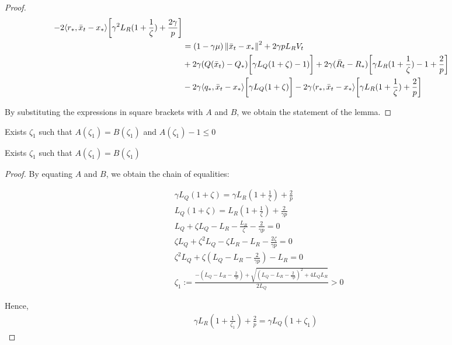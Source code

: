 \begin{proof}
\begin{align}
\begin{split}
            - 2\langle r_*, \bar{x}_t - x_*\rangle\biggr[ \gamma^2 L_R(1+\frac{1}{\zeta}) + \frac{2\gamma}{p} \biggr] \\
            &= (1 - \gamma \mu)\left\|\bar{x}_t - x_*\right\|^2 + 2 \gamma p L_R V_t \\
            &+ 2\gamma (Q(\bar{x}_t) - Q_*)\biggr[ \gamma L_Q (1+\zeta) - 1) \biggr] 
            + 2\gamma (\bar{R}_t - R_*)\biggr[ \gamma L_R (1+\frac{1}{\zeta}) - 1 + \frac{2}{p} \biggr] \\
            &- 2\gamma \langle q_*, \bar{x}_t - x_*\rangle\biggr[ \gamma L_Q(1+\zeta)  \biggr]
            - 2\gamma \langle r_*, \bar{x}_t - x_*\rangle\biggr[ \gamma L_R(1+\frac{1}{\zeta}) + \frac{2}{p} \biggr]
        \end{split}
    \end{align}
        
By substituting the expressions in square brackets with $A$ and $B$, we obtain the statement of the lemma.
\end{proof}

\begin{lemma}\label{lem:Technical}
    Exists $\zeta_1$ such that $A(\zeta_1) = B(\zeta_1)$ and $A(\zeta_1) - 1 \leq 0$
\end{lemma}
\begin{sublemma}\label{sublem:sublemma_1}
    Exists $\zeta_1$ such that $A(\zeta_1) = B(\zeta_1)$
\end{sublemma}
\begin{proof}
    By equating $A$ and $B$, we obtain the chain of equalities:

    \begin{align}
        &\gamma L_Q(1+\zeta)= \gamma L_R(1+\frac{1}{\zeta}) + \frac{2}{p} \\
        &L_Q(1+\zeta) = L_R(1+\frac{1}{\zeta}) + \frac{2}{\gamma p} \\
        &L_Q + \zeta L_Q - L_R - \frac{L_R}{\zeta} - \frac{2}{\gamma p} = 0 \\
        &\zeta L_Q + \zeta^2 L_Q - \zeta L_R - L_R - \frac{2\zeta}{\gamma p} = 0\\
        &\zeta^2 L_Q + \zeta (L_Q - L_R - \frac{2}{\gamma p}) - L_R = 0 \\
        &\zeta_{1} := \frac{-(L_Q - L_R - \frac{2}{\gamma p}) + \sqrt{(L_Q - L_R - \frac{2}{\gamma p})^2 + 4 L_Q L_R}}{2L_Q} > 0
    \end{align}
    
    Hence,
    \begin{align}
        \gamma L_R (1+\frac{1}{\zeta_1}) + \frac{2}{p} = \gamma L_Q (1+\zeta_1) \label{eq:St_5}
    \end{align}
\end{proof}


